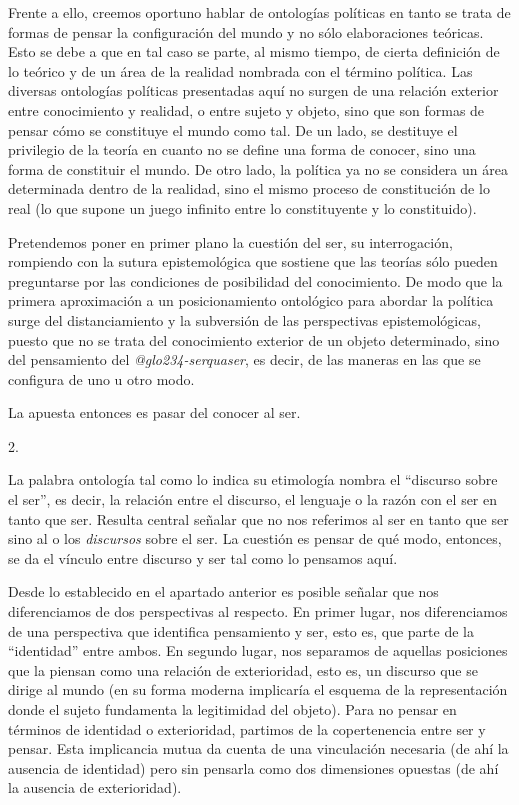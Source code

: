 Frente a ello, creemos oportuno hablar de ontologías políticas en tanto se trata de formas de pensar la configuración del mundo y no sólo elaboraciones teóricas. Esto se debe a que en tal caso se parte, al mismo tiempo, de cierta definición de lo teórico y de un área de la realidad nombrada con el término política. Las diversas ontologías políticas presentadas aquí no surgen de una relación exterior entre conocimiento y realidad, o entre sujeto y objeto, sino que son formas de pensar cómo se constituye el mundo como tal. De un lado, se destituye el privilegio de la teoría en cuanto no se define una forma de conocer, sino una forma de constituir el mundo. De otro lado, la política ya no se considera un área determinada dentro de la realidad, sino el mismo proceso de constitución de lo real (lo que supone un juego infinito entre lo constituyente y lo constituido).

Pretendemos poner en primer plano la cuestión del ser, su interrogación, rompiendo con la sutura epistemológica que sostiene que las teorías sólo pueden preguntarse por las condiciones de posibilidad del conocimiento. De modo que la primera aproximación a un posicionamiento ontológico para abordar la política surge del distanciamiento y la subversión de las perspectivas epistemológicas, puesto que no se trata del conocimiento exterior de un objeto determinado, sino del pensamiento del \emph{\gls{@glo234-serquaser}}, es decir, de las maneras en las que se configura de uno u otro modo.

La apuesta entonces es pasar del conocer al ser.

2.

La palabra ontología tal como lo indica su etimología nombra el \enquote{discurso sobre el ser}, es decir, la relación entre el discurso, el lenguaje o la razón con el ser en tanto que ser. Resulta central señalar que no nos referimos al ser en tanto que ser  sino al o los \emph{discursos} sobre el ser. La cuestión es pensar de qué modo, entonces, se da el vínculo entre discurso y ser tal como lo pensamos aquí.

Desde lo establecido en el apartado anterior es posible señalar que nos diferenciamos de dos perspectivas al respecto. En primer lugar, nos diferenciamos de una perspectiva que identifica pensamiento y ser, esto es, que parte de la \enquote{identidad} entre ambos. En segundo lugar, nos separamos de aquellas posiciones que la piensan como una relación de exterioridad, esto es, un discurso que se dirige al mundo (en su forma moderna implicaría el esquema de la representación donde el sujeto fundamenta la legitimidad del objeto). Para no pensar en términos de identidad o exterioridad, partimos de la copertenencia entre ser y pensar. Esta implicancia mutua da cuenta de una vinculación necesaria (de ahí la ausencia de identidad) pero sin pensarla como dos dimensiones opuestas (de ahí la ausencia de exterioridad).

